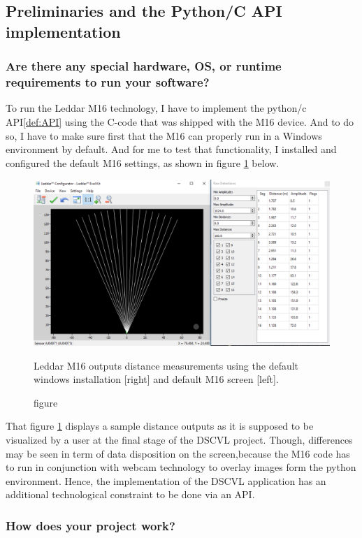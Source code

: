 \documentclass[onecolumn, draftclsnofoot,10pt, compsoc]{IEEEtran}
\begin{document}
 
\subsection{ Preliminaries and the Python/C API implementation}
	\subsubsection{Are there any special hardware, OS, or runtime requirements to run your software?}
To run the  Leddar M16 technology, I have to implement the python/c API\ref{def:API} using the C-code that was shipped with the M16 device. And to do so, I have to make sure first that  the M16 can properly run in a Windows environment by default. And for me to test that functionality, I installed and configured the default M16 settings, as shown in figure \ref{signal} below.

   \begin{figure}[H]
			\includegraphics[scale=0.5]{images/signal.eps}
			\caption{figure}{Leddar M16 outputs distance measurements  using the default windows installation [right] and default M16 screen [left].}
			\label{signal}
		\end{figure}
		
That figure \ref{signal} displays a sample distance outputs as it is supposed to be visualized by a user at the final stage of the DSCVL project. Though, differences may be seen in term of data disposition on the screen,because the M16 code has to run in conjunction with webcam technology to overlay images form the python environment. Hence, the implementation of the DSCVL application has an additional technological constraint to be done via an API.
		
		\subsubsection{How does your project work?}
		
\end{document}
